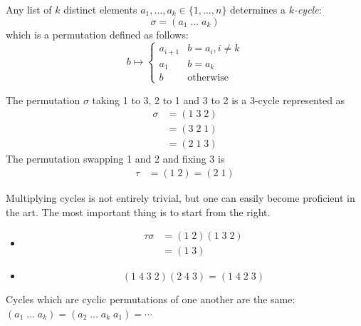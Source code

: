 \documentclass{../template/note}
\begin{document}
    \begin{definition}
        Any list of \(k\) distinct elements \(a_1, \dots, a_k \in \{1, \dots, n\}\) determines a \emph{\(k\)-cycle}:
        \[
            \sigma = (a_1 \; \dots \; a_k)
        \]
        which is a permutation defined as follows:
        \[
            b \mapsto \begin{cases}
                a_{i+1} & b = a_i, i \neq k \\
                a_1 & b = a_k \\
                b & \text{otherwise}
            \end{cases}
        \]
    \end{definition}
    \begin{example}
        The permutation \(\sigma\) taking 1 to 3, 2 to 1 and 3 to 2 is a 3-cycle represented as
        \begin{align*}
            \sigma &= (1\; 3\; 2) \\
            &= (3\; 2\; 1) \\
            &= (2\; 1\; 3)
        \end{align*}
        The permutation swapping 1 and 2 and fixing 3 is
        \begin{align*}
            \tau &= (1 \; 2) = (2\; 1)
        \end{align*}
    \end{example}
    Multiplying cycles is not entirely trivial, but one can easily become proficient in the art. The most important thing is to start from the right.
    \begin{example}
        \begin{itemize}
            \item \begin{align*}
                \tau \sigma &= (1 \; 2)(1 \; 3 \; 2) \\
                &= (1\; 3)
            \end{align*}
            \item \[
                (1\; 4\; 3\; 2)(2\; 4\; 3) = (1\; 4\; 2\; 3)
            \]
        \end{itemize}
    \end{example}
    
    \begin{remark*}
        Cycles which are cyclic permutations of one another are the same: \((a_1\; \dots \; a_k) = (a_2 \; \dots \; a_k\; a_1) = \cdots\)
    \end{remark*}
    
\end{document}
